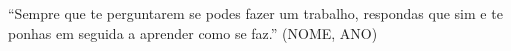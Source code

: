 \begin{epigrafe}
\vspace*{\fill}
\begin{flushright}
\begin{minipage}{0.5\textwidth}
``Sempre que te perguntarem se podes fazer um trabalho, respondas que sim e te ponhas em seguida a aprender como se faz.'' (NOME, ANO)
\end{minipage}
\end{flushright}
\end{epigrafe}